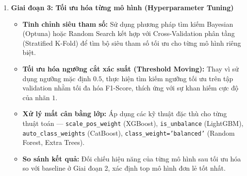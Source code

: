 \begin{enumerate}
    \item \textbf{Giai đoạn 3: Tối ưu hóa từng mô hình (Hyperparameter Tuning)}
    \begin{itemize}
        \item \textbf{Tinh chỉnh siêu tham số:} Sử dụng phương pháp tìm kiếm Bayesian (Optuna) hoặc Random Search kết hợp với Cross-Validation phân tầng (Stratified K-Fold) để tìm bộ siêu tham số tối ưu cho từng mô hình riêng biệt.
        \item \textbf{Tối ưu hóa ngưỡng cắt xác suất (Threshold Moving):} Thay vì sử dụng ngưỡng mặc định $0.5$, thực hiện tìm kiếm ngưỡng tối ưu trên tập validation nhằm tối đa hóa F1-Score, thích ứng với sự khan hiếm cực độ của nhãn $1$.
        \item \textbf{Xử lý mất cân bằng lớp:} Áp dụng các kỹ thuật đặc thù cho từng thuật toán — \texttt{scale\_pos\_weight} (XGBoost), \texttt{is\_unbalance} (LightGBM), \texttt{auto\_class\_weights} (CatBoost), \texttt{class\_weight='balanced'} (Random Forest, Extra Trees).
        \item \textbf{So sánh kết quả:} Đối chiếu hiệu năng của từng mô hình sau tối ưu hóa so với baseline ở Giai đoạn 2, xác định top mô hình đơn lẻ tốt nhất.
    \end{itemize}


\end{enumerate}
